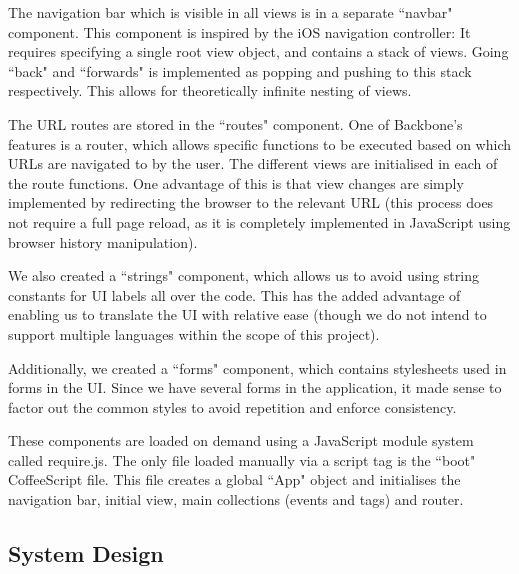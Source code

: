 \documentclass[11pt]{article}
\begin{document}
The navigation bar which is visible in all views is in a separate ``navbar" component. This component is inspired by the iOS navigation controller: It requires specifying a single root view object, and contains a stack of views. Going ``back" and ``forwards" is implemented as popping and pushing to this stack respectively. This allows for theoretically infinite nesting of views.

The URL routes are stored in the ``routes" component. One of Backbone's features is a router, which allows specific functions to be executed based on which URLs are navigated to by the user. The different views are initialised in each of the route functions. One advantage of this is that view changes are simply implemented by redirecting the browser to the relevant URL (this process does not require a full page reload, as it is completely implemented in JavaScript using browser history manipulation).

We also created a ``strings" component, which allows us to avoid using string constants for UI labels all over the code. This has the added advantage of enabling us to translate the UI with relative ease (though we do not intend to support multiple languages within the scope of this project).

Additionally, we created a ``forms" component, which contains stylesheets used in forms in the UI. Since we have several forms in the application, it made sense to factor out the common styles to avoid repetition and enforce consistency.

These components are loaded on demand using a JavaScript module system called require.js. The only file loaded manually via a script tag is the ``boot" CoffeeScript file. This file creates a global ``App" object and initialises the navigation bar, initial view, main collections (events and tags) and router.

\subsection {System Design}
\end{document}
